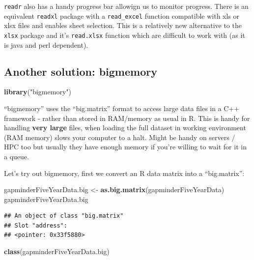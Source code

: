 \documentclass[]{article}
\newenvironment{Shaded}{\begin{snugshade}}{\end{snugshade}}
\newcommand{\KeywordTok}[1]{\textcolor[rgb]{0.13,0.29,0.53}{\textbf{{#1}}}}
\newcommand{\StringTok}[1]{\textcolor[rgb]{0.31,0.60,0.02}{{#1}}}
\newcommand{\NormalTok}[1]{{#1}}
\begin{document}
\texttt{readr} also has a handy progress bar allowign us to monitor
progress. There is an equivalent \texttt{readxl} package with a
\texttt{read\_excel} function compatible with xls or xlsx files and
enables sheet selection. This is a relatively new alternative to the
\texttt{xlsx} package and it's \texttt{read.xlsx} function which are
difficult to work with (as it is java and perl dependent).

\subsection{Another solution:
bigmemory}\label{another-solution-bigmemory}

\begin{Shaded}
\begin{Highlighting}[]
\KeywordTok{library}\NormalTok{(}\StringTok{"bigmemory"}\NormalTok{)}
\end{Highlighting}
\end{Shaded}

``bigmemory'' uses the ``big.matrix'' format to access large data files
in a C++ framework - rather than stored in RAM/memory as usual in R.
This is handy for handling \textbf{very large} files, when loading the
full dataset in working environment (RAM memory) slows your computer to
a halt. Might be handy on servers / HPC too but usually they have enough
memory if you're willing to wait for it in a queue.

Let's try out bigmemory, first we convert an R data matrix into a
``big.matrix'':

\begin{Shaded}
\begin{Highlighting}[]
\NormalTok{gapminderFiveYearData.big <-}\StringTok{ }\KeywordTok{as.big.matrix}\NormalTok{(gapminderFiveYearData)}
\NormalTok{gapminderFiveYearData.big}
\end{Highlighting}
\end{Shaded}

\begin{verbatim}
## An object of class "big.matrix"
## Slot "address":
## <pointer: 0x33f5880>
\end{verbatim}

\begin{Shaded}
\begin{Highlighting}[]
\KeywordTok{class}\NormalTok{(gapminderFiveYearData.big)}
\end{Highlighting}
\end{Shaded}
\end{document}
